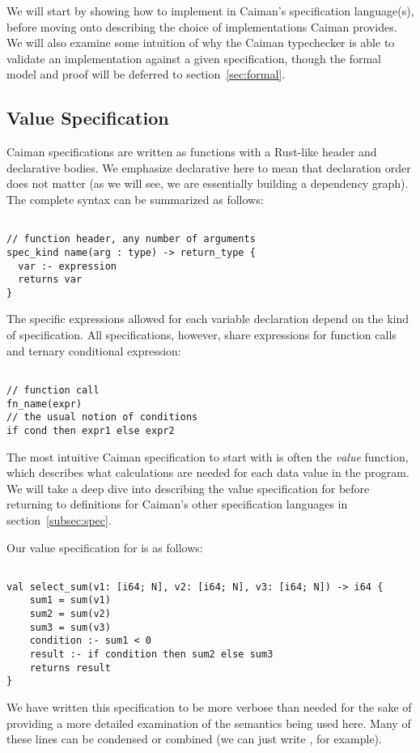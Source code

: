 We will start by showing how to implement  in Caiman's specification language(s), before moving onto describing the choice of implementations Caiman provides.  We will also examine some intuition of why the Caiman typechecker is able to validate an implementation against a given specification, though the formal model and proof will be deferred to section~\ref{sec:formal}.

\subsection{Value Specification}
\label{subsec:value}

Caiman specifications are written as functions with a Rust-like header and declarative bodies.  We emphasize declarative here to mean that declaration order does not matter (as we will see, we are essentially building a dependency graph).  The complete syntax can be summarized as follows:
%
\begin{lstlisting}

// function header, any number of arguments
spec_kind name(arg : type) -> return_type {
  var :- expression
  returns var
}
\end{lstlisting}
%
The specific expressions allowed for each variable declaration depend on the kind of specification.  All specifications, however, share expressions for function calls and ternary conditional expression:
%
\begin{lstlisting}

// function call
fn_name(expr)
// the usual notion of conditions
if cond then expr1 else expr2
\end{lstlisting}
%
The most intuitive Caiman specification to start with is often the \textit{value} function, which describes what calculations are needed for each data value in the program.  We will take a deep dive into describing the value specification for  before returning to definitions for Caiman's other specification languages in section~\ref{subsec:spec}.  

Our value specification for  is as follows:
%
\begin{lstlisting}

val select_sum(v1: [i64; N], v2: [i64; N], v3: [i64; N]) -> i64 {
    sum1 = sum(v1)
    sum2 = sum(v2)
    sum3 = sum(v3)
    condition :- sum1 < 0
    result :- if condition then sum2 else sum3
    returns result
}
\end{lstlisting}
%
We have written this specification to be more verbose than needed for the sake of providing a more detailed examination of the semantics being used here.  Many of these lines can be condensed or combined (we can just write , for example).

